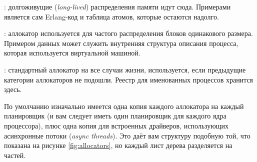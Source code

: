 \documentclass[11pt, oneside]{book}   	%
\newcommand\NamedRef[1]{\ref{#1} <<\nameref{#1}>>}
\begin{document}
\begin{enumerate*}
	\item {}: долгоживущие (\emph{long-lived}) распределения памяти идут сюда. Примерами является сам Erlang-код и таблица атомов, которые остаются надолго.
	\item {}: аллокатор используется для частого распределения блоков одинакового размера. Примером данных может служить внутренняя структура описания процесса, которая используется виртуальной машиной.
	\item {}: стандартный аллокатор на все случаи жизни, используется, если предыдущие категории аллокаторов не подошли. Реестр для именованных процессов хранится здесь.	
\end{enumerate*}

По умолчанию изначально имеется одна копия каждого аллокатора на каждый планировщик (и вам следует иметь один планировщик для каждого ядра процессора), плюс одна копия для встроенных драйверов, использующих асинхронные потоки (\emph{async threads}). Это даёт вам структуру подобную той, что показана на рисунке \ref{fig:allocators}, но каждый лист дерева разделяется на  частей.
\end{document}
